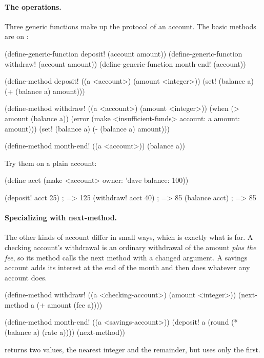 \paragraph{The operations.} Three generic functions make up the protocol
of an account. The basic methods are on :

\begin{dylan}
(define-generic-function deposit! (account amount))
(define-generic-function withdraw! (account amount))
(define-generic-function month-end! (account))

(define-method deposit! ((a <account>) (amount <integer>))
  (set! (balance a) (+ (balance a) amount)))

(define-method withdraw! ((a <account>) (amount <integer>))
  (when (> amount (balance a))
    (error (make <insufficient-funds> account: a amount: amount)))
  (set! (balance a) (- (balance a) amount)))

(define-method month-end! ((a <account>))
  (balance a))
\end{dylan}

Try them on a plain account:

\begin{dylan}
(define acct (make <account> owner: 'dave balance: 100))

(deposit! acct 25)              ; => 125
(withdraw! acct 40)             ; => 85
(balance acct)                  ; => 85
\end{dylan}

\paragraph{Specializing with next-method.} The other kinds of account
differ in small ways, which is exactly what  is for. A
checking account's withdrawal is an ordinary withdrawal of the amount
\emph{plus the fee}, so its method calls the next method with a changed
argument. A savings account adds its interest at the end of the month and
then does whatever any account does.

\begin{dylan}
(define-method withdraw! ((a <checking-account>) (amount <integer>))
  (next-method a (+ amount (fee a))))

(define-method month-end! ((a <savings-account>))
  (deposit! a (round (* (balance a) (rate a))))
  (next-method))
\end{dylan}

 returns two values, the nearest integer and the remainder,
but  uses only the first.

